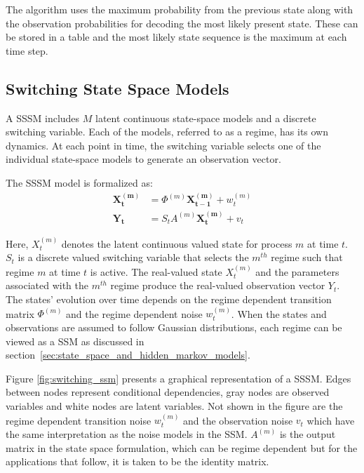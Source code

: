 The algorithm uses the maximum probability from the previous state along with the observation probabilities for decoding the most likely present state. These can be stored in a table and the most likely state sequence is the maximum at each time step.



\subsection{Switching State Space Models}\label{sec:switching_state_space_models}
A SSSM includes $M$ latent continuous state-space models and a discrete switching variable. Each of the models, referred to as a regime, has its own dynamics. At each point in time, the switching variable selects one of the individual state-space models to generate an observation vector.

The SSSM model is formalized as:
\begin{equation}
  \begin{split}
      \mathbf{X^{(m)}_t} &= \Phi^{(m)}\mathbf{X^{(m)}_{t-1}} + w^{(m)}_t \\
      \mathbf{Y_t} &= S_t A^{(m)}\mathbf{X^{(m)}_t} + v_t
  \end{split}\label{eq:switching_state_space}
\end{equation}

Here, $X_t^{(m)}$ denotes the latent continuous valued state for process $m$ at time $t$. $S_t$ is a discrete valued switching variable that selects the $m^{th}$ regime such that regime $m$ at time $t$ is active. The real-valued state $X_t^{(m)}$ and the parameters associated with the $m^{th}$ regime produce the real-valued observation vector $Y_t$. The states' evolution over time depends on the regime dependent transition matrix $\Phi^{(m)}$ and the regime dependent noise $w_t^{(m)}$. When the states and observations are assumed to follow Gaussian distributions, each regime can be viewed as a SSM as discussed in section~\ref{sec:state_space_and_hidden_markov_models}.

Figure \ref{fig:switching_ssm} presents a graphical representation of a SSSM. Edges between nodes represent conditional dependencies, gray nodes are observed variables and white nodes are latent variables. Not shown in the figure are the regime dependent transition noise $w_t^{(m)}$ and the observation noise $v_t$ which have the same interpretation as the noise models in the SSM. $A^{(m)}$ is the output matrix in the state space formulation, which can be regime dependent but for the applications that follow, it is taken to be the identity matrix.

